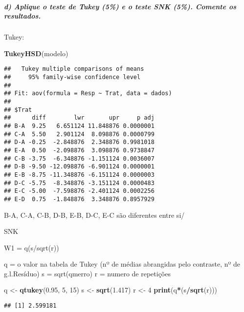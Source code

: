 \documentclass[
]{article}
\newenvironment{Shaded}{\begin{snugshade}}{\end{snugshade}}
\newcommand{\DecValTok}[1]{\textcolor[rgb]{0.00,0.00,0.81}{#1}}
\newcommand{\FloatTok}[1]{\textcolor[rgb]{0.00,0.00,0.81}{#1}}
\newcommand{\FunctionTok}[1]{\textcolor[rgb]{0.13,0.29,0.53}{\textbf{#1}}}
\newcommand{\NormalTok}[1]{#1}
\newcommand{\OtherTok}[1]{\textcolor[rgb]{0.56,0.35,0.01}{#1}}
\newcommand{\SpecialCharTok}[1]{\textcolor[rgb]{0.81,0.36,0.00}{\textbf{#1}}}
\begin{document}
\hypertarget{d-aplique-o-teste-de-tukey-5-e-o-teste-snk-5.-comente-os-resultados.}{%
\subparagraph{d) Aplique o teste de Tukey (5\%) e o teste SNK (5\%).
Comente os
resultados.}\label{d-aplique-o-teste-de-tukey-5-e-o-teste-snk-5.-comente-os-resultados.}}

Tukey:

\begin{Shaded}
\begin{Highlighting}[]
\FunctionTok{TukeyHSD}\NormalTok{(modelo)}
\end{Highlighting}
\end{Shaded}

\begin{verbatim}
##   Tukey multiple comparisons of means
##     95% family-wise confidence level
## 
## Fit: aov(formula = Resp ~ Trat, data = dados)
## 
## $Trat
##      diff        lwr       upr     p adj
## B-A  9.25   6.651124 11.848876 0.0000001
## C-A  5.50   2.901124  8.098876 0.0000799
## D-A -0.25  -2.848876  2.348876 0.9981018
## E-A  0.50  -2.098876  3.098876 0.9738847
## C-B -3.75  -6.348876 -1.151124 0.0036007
## D-B -9.50 -12.098876 -6.901124 0.0000001
## E-B -8.75 -11.348876 -6.151124 0.0000003
## D-C -5.75  -8.348876 -3.151124 0.0000483
## E-C -5.00  -7.598876 -2.401124 0.0002256
## E-D  0.75  -1.848876  3.348876 0.8957929
\end{verbatim}

B-A, C-A, C-B, D-B, E-B, D-C, E-C são diferentes entre si/

SNK

W1 = q(s/sqrt(r))

q = o valor na tabela de Tukey (nº de médias abrangidas pelo contraste,
nº de g.l.Resíduo) s = sqrt(qmerro) r = numero de repetições

\begin{Shaded}
\begin{Highlighting}[]
\NormalTok{q }\OtherTok{\textless{}{-}} \FunctionTok{qtukey}\NormalTok{(}\FloatTok{0.95}\NormalTok{, }\DecValTok{5}\NormalTok{, }\DecValTok{15}\NormalTok{) }
\NormalTok{s }\OtherTok{\textless{}{-}} \FunctionTok{sqrt}\NormalTok{(}\FloatTok{1.417}\NormalTok{)}
\NormalTok{r }\OtherTok{\textless{}{-}} \DecValTok{4}
\FunctionTok{print}\NormalTok{(q}\SpecialCharTok{*}\NormalTok{(s}\SpecialCharTok{/}\FunctionTok{sqrt}\NormalTok{(r)))}
\end{Highlighting}
\end{Shaded}

\begin{verbatim}
## [1] 2.599181
\end{verbatim}
\end{document}
